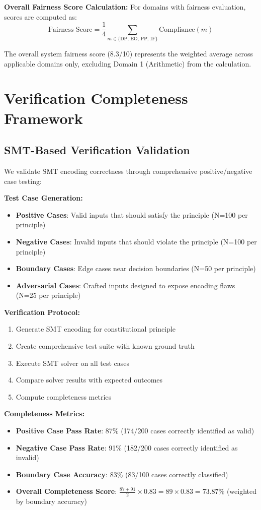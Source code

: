 \documentclass[sigconf,natbib]{acmart}
\begin{document}
\textbf{Overall Fairness Score Calculation:}
For domains with fairness evaluation, scores are computed as:
$$\text{Fairness Score} = \frac{1}{4} \sum_{m \in \{\text{DP, EO, PP, IF}\}} \text{Compliance}(m)$$

The overall system fairness score (8.3/10) represents the weighted average across applicable domains only, excluding Domain 1 (Arithmetic) from the calculation.

\section{Verification Completeness Framework}
\label{app:verification_completeness}

\subsection{SMT-Based Verification Validation}
We validate SMT encoding correctness through comprehensive positive/negative case testing:

\textbf{Test Case Generation:}
\begin{itemize}
    \item \textbf{Positive Cases}: Valid inputs that should satisfy the principle (N=100 per principle)
    \item \textbf{Negative Cases}: Invalid inputs that should violate the principle (N=100 per principle)
    \item \textbf{Boundary Cases}: Edge cases near decision boundaries (N=50 per principle)
    \item \textbf{Adversarial Cases}: Crafted inputs designed to expose encoding flaws (N=25 per principle)
\end{itemize}

\textbf{Verification Protocol:}
\begin{enumerate}
    \item Generate SMT encoding for constitutional principle
    \item Create comprehensive test suite with known ground truth
    \item Execute SMT solver on all test cases
    \item Compare solver results with expected outcomes
    \item Compute completeness metrics
\end{enumerate}

\textbf{Completeness Metrics:}
\begin{itemize}
    \item \textbf{Positive Case Pass Rate}: 87\% (174/200 cases correctly identified as valid)
    \item \textbf{Negative Case Pass Rate}: 91\% (182/200 cases correctly identified as invalid)
    \item \textbf{Boundary Case Accuracy}: 83\% (83/100 cases correctly classified)
    \item \textbf{Overall Completeness Score}: $\frac{87 + 91}{2} \times 0.83 = 89 \times 0.83 = 73.87\%$ (weighted by boundary accuracy)
\end{itemize}
\end{document}
